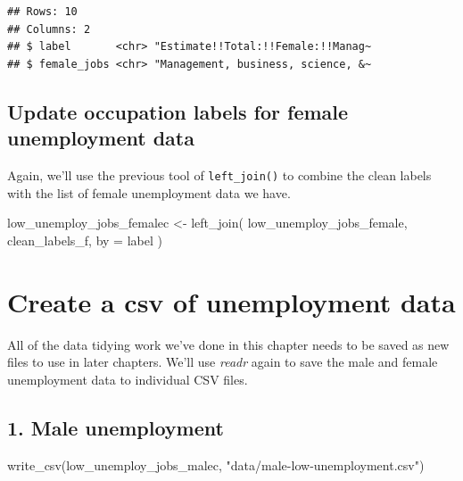 \documentclass[
  krantz2]{krantz}
\makeatletter
\newenvironment{Shaded}{\begin{snugshade}}{\end{snugshade}}
\newcommand{\AttributeTok}[1]{\textcolor[rgb]{0.61,0.61,0.61}{#1}}
\newcommand{\FunctionTok}[1]{\textcolor[rgb]{0,0,0}{#1}}
\newcommand{\NormalTok}[1]{#1}
\newcommand{\OtherTok}[1]{\textcolor[rgb]{0.37,0.37,0.37}{#1}}
\newcommand{\StringTok}[1]{\textcolor[rgb]{0.5,0.5,0.5}{#1}}
\newenvironment{kframe}{%
\medskip{}
\setlength{\fboxsep}{.8em}
 \def\at@end@of@kframe{}%
 \ifinner\ifhmode%
  \def\at@end@of@kframe{\end{minipage}}%
  \begin{minipage}{\columnwidth}%
 \fi\fi%
 \def\FrameCommand##1{\hskip\@totalleftmargin \hskip-\fboxsep
 \colorbox{shadecolor}{##1}\hskip-\fboxsep
     \hskip-\linewidth \hskip-\@totalleftmargin \hskip\columnwidth}%
 \MakeFramed {\advance\hsize-\width
   \@totalleftmargin\z@ \linewidth\hsize
   \@setminipage}}%
 {\par\unskip\endMakeFramed%
 \at@end@of@kframe}
\renewenvironment{Shaded}{\begin{kframe}}{\end{kframe}}
\makeatother
\begin{document}
\begin{verbatim}
## Rows: 10
## Columns: 2
## $ label       <chr> "Estimate!!Total:!!Female:!!Manag~
## $ female_jobs <chr> "Management, business, science, &~
\end{verbatim}

\hypertarget{update-occupation-labels-for-female-unemployment-data}{%
\subsection{Update occupation labels for female unemployment data}\label{update-occupation-labels-for-female-unemployment-data}}

Again, we'll use the previous tool of \texttt{left\_join()} to combine the clean labels with the list of female unemployment data we have.

\begin{Shaded}
\begin{Highlighting}[]
\NormalTok{low\_unemploy\_jobs\_femalec }\OtherTok{\textless{}{-}} \FunctionTok{left\_join}\NormalTok{(}
\NormalTok{  low\_unemploy\_jobs\_female,}
\NormalTok{  clean\_labels\_f,}
  \AttributeTok{by =} \StringTok{\textquotesingle{}label\textquotesingle{}}
\NormalTok{  )}
\end{Highlighting}
\end{Shaded}

\hypertarget{unemploy-csv}{%
\section{Create a csv of unemployment data}\label{unemploy-csv}}

All of the data tidying work we've done in this chapter needs to be saved as new files to use in later chapters. We'll use \emph{readr} again to save the male and female unemployment data to individual CSV files.

\hypertarget{male-unemployment}{%
\subsection{1. Male unemployment}\label{male-unemployment}}

\begin{Shaded}
\begin{Highlighting}[]
\FunctionTok{write\_csv}\NormalTok{(low\_unemploy\_jobs\_malec, }\StringTok{"data/male{-}low{-}unemployment.csv"}\NormalTok{)}
\end{Highlighting}
\end{Shaded}
\end{document}
